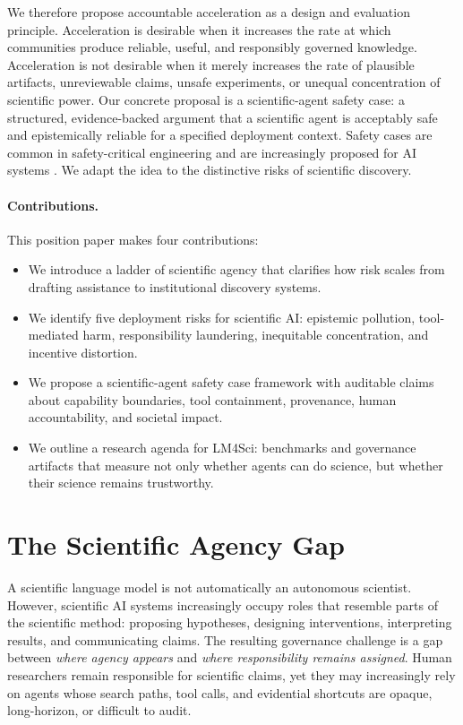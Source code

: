 \documentclass{article}
\newcommand{\position}{accountable acceleration}
\newcommand{\safetycase}{scientific-agent safety case}
\begin{document}
We therefore propose \position{} as a design and evaluation principle. Acceleration is desirable when it increases the rate at which communities produce reliable, useful, and responsibly governed knowledge. Acceleration is not desirable when it merely increases the rate of plausible artifacts, unreviewable claims, unsafe experiments, or unequal concentration of scientific power. Our concrete proposal is a \safetycase{}: a structured, evidence-backed argument that a scientific agent is acceptably safe and epistemically reliable for a specified deployment context. Safety cases are common in safety-critical engineering and are increasingly proposed for AI systems \citep{habli2025big}. We adapt the idea to the distinctive risks of scientific discovery.

\paragraph{Contributions.} This position paper makes four contributions:
\begin{itemize}
  \item We introduce a ladder of scientific agency that clarifies how risk scales from drafting assistance to institutional discovery systems.
  \item We identify five deployment risks for scientific AI: epistemic pollution, tool-mediated harm, responsibility laundering, inequitable concentration, and incentive distortion.
  \item We propose a \safetycase{} framework with auditable claims about capability boundaries, tool containment, provenance, human accountability, and societal impact.
  \item We outline a research agenda for LM4Sci: benchmarks and governance artifacts that measure not only whether agents can do science, but whether their science remains trustworthy.
\end{itemize}

\section{The Scientific Agency Gap}

A scientific language model is not automatically an autonomous scientist. However, scientific AI systems increasingly occupy roles that resemble parts of the scientific method: proposing hypotheses, designing interventions, interpreting results, and communicating claims. The resulting governance challenge is a gap between \emph{where agency appears} and \emph{where responsibility remains assigned}. Human researchers remain responsible for scientific claims, yet they may increasingly rely on agents whose search paths, tool calls, and evidential shortcuts are opaque, long-horizon, or difficult to audit.
\end{document}
